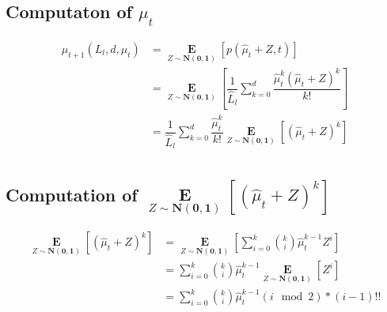 \documentclass{article}
\DeclareMathOperator*{\expectation}{\mathbf{E}}
\begin{document}
\subsection{Computaton of $\mu_t$}

\newcommand{\E}[1]{ \expectation\limits_{Z\sim \mathbf{N(0,1)}} \left[ {#1} \right]}
\renewcommand{\L}{\hat{L}_l}
\newcommand{\mut}{\hat{\mu}_{t}}
\begin{align*}
  \mu_{t+1}(L_l, d, \mu_t) &= \E{p(\mut+Z , t)} \\
                          &= \E{\dfrac{1}{\L} \sum\limits_{k=0}^d \dfrac{\mut^k(\mut+Z)^k}{k!}}\\
                          &= \dfrac{1}{\L} \sum\limits_{k=0}^d \dfrac{\mut^k}{k!} \E{(\mut+Z)^k}\\
\end{align*}
\subsection{Computation of $ \E{(\mut+Z)^k}$}
\begin{align*}
  \E{(\mut+Z)^k} &= \E{\sum\limits_{i=0}^k \binom{k}{i} \mut^{k-1} Z^{i}} \\
                 &= \sum\limits_{i=0}^k \binom{k}{i} \mut^{k-1} \E{Z^{i}} \\
                 &= \sum\limits_{i=0}^k \binom{k}{i} \mut^{k-1}  (i \mod 2) * (i-1)!! \\
\end{align*}
\end{document}
